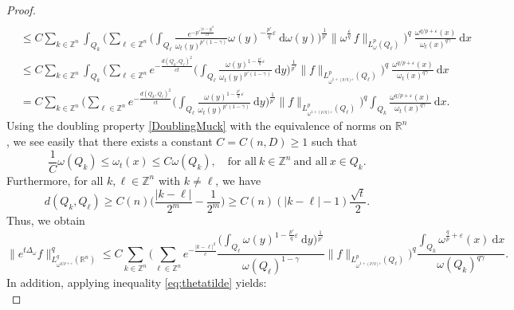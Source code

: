 \documentclass[10pt,a4paper]{amsart}
\begin{document}
\begin{proof}
\begin{align*}
        \\& \leq C \sum_{k\in \mathbb{Z}^n} \int_{Q_{k}} \bigg( \sum_{\ell\in \mathbb{Z}^n} \bigg( \int_{Q_{\ell}} \frac{e^{-p'\frac{|x-y|^2}{ct}}}{\omega_t(y)^{p'(1-\gamma)}} \omega(y)^{-\frac{p'}{q}\varepsilon} \ \mathrm{d} \omega(y) \bigg)^{\frac{1}{p'}} \|\omega^{\frac{\varepsilon}{q}}  \, f \|_{L^p_\omega(Q_{\ell})} \bigg)^q \ \frac{\omega^{q/p+\varepsilon}(x)}{\omega_t(x)^{q \gamma}} \ \mathrm{d}x
        \\& \leq C \sum_{k\in \mathbb{Z}^n} \int_{Q_{k}} \bigg( \sum_{\ell \in \mathbb{Z}^n} e^{-\frac{d(Q_{k},Q_{\ell})^2}{ct}} \bigg( \int_{Q_{\ell}} \frac{\omega(y)^{1-\frac{p'}{q}\varepsilon}}{\omega_t(y)^{p'(1-\gamma)}} \ \mathrm{d} y \bigg )^{\frac{1}{p'}} \| f \|_{L^p_{\omega^{1+(p/q)\varepsilon}}(Q_{\ell})} \bigg)^q \ \frac{\omega^{q/p+\varepsilon}(x)}{\omega_t(x)^{q \gamma}} \ \mathrm{d}x 
        \\& = C \sum_{k\in \mathbb{Z}^n}  \bigg( \sum_{\ell \in \mathbb{Z}^n} e^{-\frac{d(Q_{k},Q_{\ell})^2}{ct}} \bigg( \int_{Q_{\ell}} \frac{\omega(y)^{1-\frac{p'}{q}\varepsilon}}{\omega_t(y)^{p'(1-\gamma)}} \ \mathrm{d} y \bigg)^{\frac{1}{p'}} \| f \|_{L^p_{\omega^{1+(p/q)\varepsilon}}(Q_{\ell})} \bigg)^q \int_{Q_{k}} \frac{\omega^{q/p+\varepsilon}(x)}{\omega_t(x)^{q \gamma}} \ \mathrm{d}x.
    \end{align*}
    Using the doubling property \eqref{DoublingMuck} with the equivalence of norms on $\mathbb{R}^n$, we see easily that there exists a constant $C=C(n,D)\ge 1 $ such that 
    $$ \frac{1}{C} \omega(Q_{k}) \leq \omega_t(x) \leq C \omega(Q_{k}), \quad \text{for all} \ k\in \mathbb{Z}^n \ \text{and all} \ x \in Q_{k}.$$
    Furthermore, for all $k,\ell \in \mathbb{Z}^n$ with $k \neq \ell$, we have
    $$d(Q_{k},Q_{\ell}) \ge C(n) \bigg(\frac{|k-\ell|}{2^m}-\frac{1}{2^m}\bigg) \ge C(n)(|k-\ell|-1)\frac{\sqrt{t}}{2}.$$
    Thus, we obtain 
    \begin{equation}\label{eq:smgroupe}
        \| e^{t\Delta_\omega} f \|^q_{L^q_{{\omega}^{q/p+\varepsilon}}(\mathbb{R}^n)} \leq C \sum_{k\in \mathbb{Z}^n}  \bigg( \sum_{\ell\in \mathbb{Z}^n} e^{-\frac{|k-\ell|^2}{c}} \frac{\big( \int_{Q_{\ell}} \omega(y)^{1-\frac{p'}{q}\varepsilon}\ \mathrm{d} y \big)^{\frac{1}{p'}}}{\omega(Q_\ell)^{1-\gamma}}  \| f \|_{L^p_{\omega^{1+(p/q)\varepsilon}}(Q_{\ell})} \bigg)^q \frac{\int_{Q_{k}} \omega^{\frac{q}{p}+\varepsilon}(x) \ \mathrm{d}x}{\omega(Q_k)^{q\gamma}}.
    \end{equation}
    In addition, applying inequality \eqref{eq:thetatilde} yields: 
    \begin{equation}\label{eq:1}

\end{equation}
\end{proof}
\end{document}
